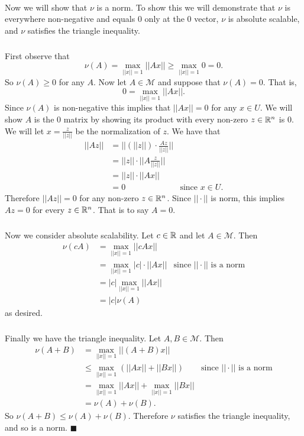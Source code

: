 \documentclass[letterpaper,12pt,oneside,onecolumn]{article}
\newcommand{\cM}{\mathcal{M}} \newcommand{\cN}{\mathcal{N}}
\begin{document}
\paragraph{}
Now we will show that $\nu$ is a norm. To show this we will demonstrate that $\nu$ is everywhere non-negative and equals $0$ only at the $0$ vector, $\nu$ is absolute scalable, and $\nu$ satisfies the triangle inequality.
\subparagraph{}
First observe that
$$\nu(A) = \max_{||x||=1} ||Ax|| \geq \max_{||x||=1} 0 = 0.$$
So $\nu(A) \geq 0$ for any $A$. Now let $A \in \cM$ and suppose that $\nu(A) = 0$. That is,
$$0 = \max_{||x|| = 1} ||Ax||.$$
Since $\nu(A)$ is non-negative this implies that $||Ax|| = 0$ for any $x \in U$.
We will show $A$ is the $0$ matrix by showing its product with every non-zero $z \in \mathbb{R}^n$ is $0$. We will let $x = \frac{z}{||z||}$ be the normalization of $z$. We have that
\begin{align*}
||Az|| &= ||(||z||)\cdot \frac{Az}{||z||}|| \\
&=||z|| \cdot ||A\frac{z}{||z||}|| \\
&= ||z||\cdot ||Ax|| \\
&= 0 &\text{since $x \in U$}.
\end{align*}
Therefore $||Az|| = 0$ for any non-zero $z \in \mathbb{R}^n$. Since $||\cdot||$ is norm, this implies $Az = 0$ for every $z \in \mathbb{R}^n$. That is to say $A=0$.
\subparagraph{}
Now we consider absolute scalability. Let $c \in \mathbb{R}$ and let $A \in \cM$. Then
\begin{align*}
\nu(cA) &= \max_{||x||=1} ||cAx|| \\
&= \max_{||x||=1} |c|\cdot||Ax|| &\text{since $||\cdot||$ is a norm}\\
&= |c| \max_{||x||=1} ||Ax|| \\
&= |c| \nu(A)
\end{align*}
as desired.
\subparagraph{}
Finally we have the triangle inequality. Let $A,B \in \cM$. Then
\begin{align*}
\nu(A + B) &= \max_{||x||=1} ||(A+B)x|| \\
&\leq \max_{||x||=1} (||Ax|| + ||Bx||) &\text{since $||\cdot||$ is a norm}\\
&= \max_{||x||=1} ||Ax|| + \max_{||x||=1} ||Bx|| \\
&= \nu(A) + \nu(B).
\end{align*}
So $\nu(A+B) \leq \nu(A) + \nu(B)$. Therefore $\nu$ satisfies the triangle inequality, and so is a norm. $\blacksquare$

\section{}
\end{document}
